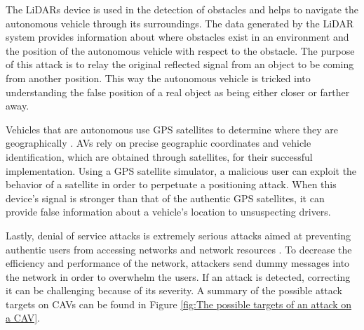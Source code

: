 \documentclass[a4paper,12pt]{article}
\begin{document}
\hspace{5mm} The LiDARs device is used in the detection of obstacles and helps to navigate the autonomous vehicle through its surroundings. The data generated by the LiDAR system provides information about where obstacles exist in an environment and the position of the autonomous vehicle with respect to the obstacle. The purpose of this attack is to relay the original reflected signal from an object to be coming from another position. This way the autonomous vehicle is tricked into understanding the false position of a real object as being either closer or farther away.

\hspace{5mm} Vehicles that are autonomous use GPS satellites to determine where they are geographically \cite{article21}. AVs rely on precise geographic coordinates and vehicle identification, which are obtained through satellites, for their successful implementation. Using a GPS satellite simulator, a malicious user can exploit the behavior of a satellite in order to perpetuate a positioning attack. When this device's signal is stronger than that of the authentic GPS satellites, it can provide false information about a vehicle's location to unsuspecting drivers.

\hspace{5mm} Lastly, denial of service attacks is extremely serious attacks aimed at preventing authentic users from accessing networks and network resources \cite{article21}. To decrease the efficiency and performance of the network, attackers send dummy messages into the network in order to overwhelm the users. If an attack is detected, correcting it can be challenging because of its severity. A summary of the possible attack targets on CAVs can be found in Figure \ref{fig:The possible targets of an attack on a CAV}.
\end{document}

